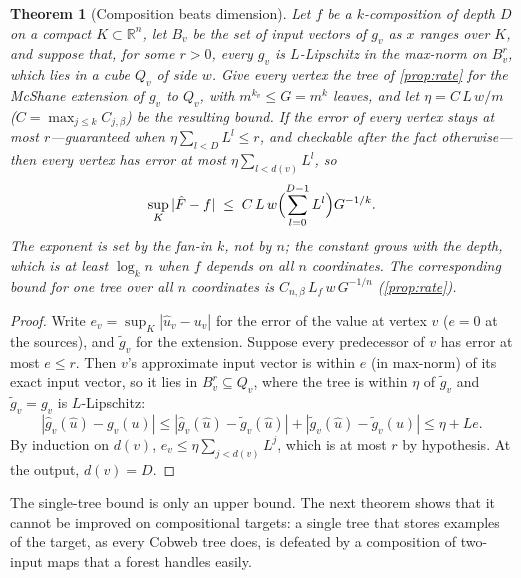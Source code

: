 \documentclass[11pt]{article}
\newtheorem{theorem}{Theorem}
\theoremstyle{definition}
\theoremstyle{remark}
\newcommand{\R}{\mathbb{R}}
\begin{document}
\begin{theorem}[Composition beats dimension]\label{thm:compose}
Let $f$ be a $k$-composition of depth $D$ on a compact $K\subset\R^n$, let $B_v$ be the
set of input vectors of $g_v$ as $x$ ranges over $K$, and suppose that, for some $r>0$,
every $g_v$ is $L$-Lipschitz in the max-norm on $B_v^r$, which lies in a cube $Q_v$ of side
$w$.  Give every vertex the tree of \cref{prop:rate} for the McShane extension of $g_v$ to
$Q_v$, with $m^{k_v}\le G=m^k$ leaves, and let $\eta=C\,L\,w/m$ ($C=\max_{j\le k}C_{j,\beta}$)
be the resulting bound.  If the error of every vertex stays at most $r$---guaranteed when
$\eta\sum_{l<D}L^l\le r$, and checkable after the fact otherwise---then every vertex has
error at most $\eta\sum_{l<d(v)}L^l$, so
\[
  \sup_K|\hat F-f|\;\le\;C\,L\,w\Bigl(\sum_{l=0}^{D-1}L^l\Bigr)G^{-1/k}.
\]
The exponent is set by the fan-in $k$, not by $n$; the constant grows with the depth, which
is at least $\log_kn$ when $f$ depends on all $n$ coordinates.  The corresponding bound for
one tree over all $n$ coordinates is $C_{n,\beta}\,L_f\,w\,G^{-1/n}$ (\cref{prop:rate}).
\end{theorem}

\begin{proof}
Write $e_v=\sup_K|\hat u_v-u_v|$ for the error of the value at vertex $v$ ($e=0$ at the
sources), and $\tilde g_v$ for the extension.  Suppose every predecessor of $v$ has error at
most $e\le r$.  Then $v$'s
approximate input vector is within $e$ (in max-norm) of its exact input vector, so it lies
in $B_v^r\subseteq Q_v$, where the tree is within $\eta$ of $\tilde g_v$ and $\tilde g_v=g_v$
is $L$-Lipschitz:
\[
  |\hat g_v(\hat u)-g_v(u)|\le|\hat g_v(\hat u)-\tilde g_v(\hat u)|+|\tilde g_v(\hat u)-\tilde g_v(u)|\le\eta+Le.
\]
By induction on $d(v)$, $e_v\le\eta\sum_{j<d(v)}L^j$, which is at most $r$ by hypothesis.  At the
output, $d(v)=D$.
\end{proof}

The single-tree bound is only an upper bound.  The next theorem shows that it cannot be
improved on compositional targets: a single tree that stores examples of the target, as every
Cobweb tree does, is defeated by a composition of two-input maps that a forest handles easily.
\end{document}
